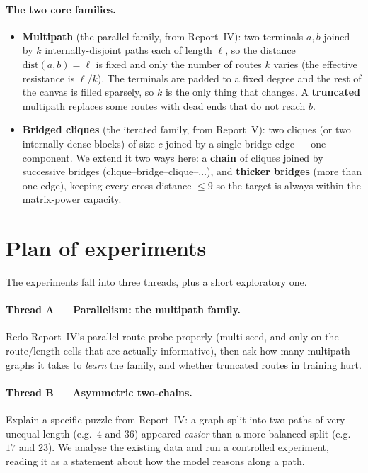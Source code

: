 \documentclass[11pt,a4paper]{article}
\begin{document}
\paragraph{The two core families.}
\begin{itemize}\setlength\itemsep{0.15em}
  \item \textbf{Multipath} (the parallel family, from Report~IV): two terminals $a,b$ joined by $k$
        internally-disjoint paths each of length $\ell$, so the distance $\mathrm{dist}(a,b)=\ell$
        is fixed and only the number of routes $k$ varies (the effective resistance is $\ell/k$).
        The terminals are padded to a fixed degree and the rest of the canvas is filled sparsely, so
        $k$ is the only thing that changes. A \textbf{truncated} multipath replaces some routes with
        dead ends that do not reach $b$.
  \item \textbf{Bridged cliques} (the iterated family, from Report~V): two cliques (or two
        internally-dense blocks) of size $c$ joined by a single bridge edge --- one component. We
        extend it two ways here: a \textbf{chain} of cliques joined by successive bridges
        (clique--bridge--clique--$\dots$), and \textbf{thicker bridges} (more than one edge), keeping
        every cross distance $\le 9$ so the target is always within the matrix-power capacity.
\end{itemize}

\section{Plan of experiments}
\label{sec:plan}

The experiments fall into three threads, plus a short exploratory one.

\paragraph{Thread A --- Parallelism: the multipath family.} Redo Report~IV's parallel-route probe
properly (multi-seed, and only on the route/length cells that are actually informative), then ask
how many multipath graphs it takes to \emph{learn} the family, and whether truncated routes in
training hurt.

\paragraph{Thread B --- Asymmetric two-chains.} Explain a specific puzzle from Report~IV: a graph
split into two paths of very unequal length (e.g.\ $4$ and $36$) appeared \emph{easier} than a more
balanced split (e.g.\ $17$ and $23$). We analyse the existing data and run a controlled experiment,
reading it as a statement about how the model reasons along a path.
\end{document}
